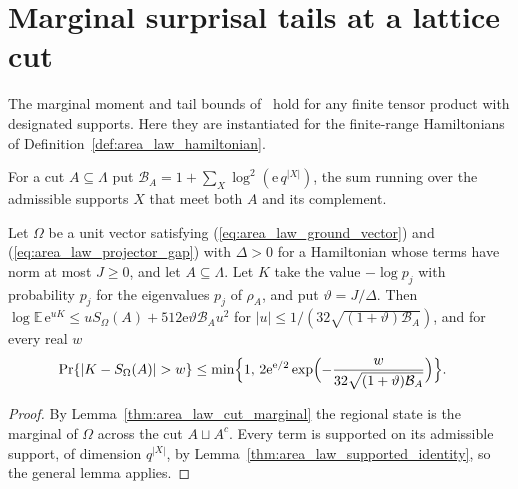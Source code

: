 \section{Marginal surprisal tails at a lattice cut}
\label{sec:area_law_marginal_tails}

The marginal moment and tail bounds of~\cite[Lemma~3.1]{OpenAI2026AreaLaw}
hold for any finite tensor product with designated supports. Here they are
instantiated for the finite-range Hamiltonians of
Definition~\ref{def:area_law_hamiltonian}.

\begin{definition}
    \label{def:area_law_cut_log_budget}
    \leanok
    For a cut $A\subseteq\Lambda$ put
    $\mathcal B_A=1+\sum_X\log^2(\mathrm e\,q^{|X|})$, the sum running over
    the admissible supports $X$ that meet both $A$ and its complement.
\end{definition}

\begin{lemma}
    \label{thm:area_law_marginal_tails}
    \leanok
    Let $\Omega$ be a unit vector satisfying (\ref{eq:area_law_ground_vector})
    and (\ref{eq:area_law_projector_gap}) with $\Delta>0$ for a Hamiltonian whose terms have norm
    at most $J\ge0$, and let $A\subseteq\Lambda$. Let $K$ take the value
    $-\log p_j$ with probability $p_j$ for the eigenvalues $p_j$ of
    $\rho_A$, and put $\vartheta=J/\Delta$. Then
    $\log\mathbb E\,\mathrm e^{uK}\le uS_\Omega(A)+512\mathrm e\vartheta
        \mathcal B_Au^2$ for $|u|\le1/(32\sqrt{(1+\vartheta)\mathcal B_A})$, and
    for every real $w$
    \begin{align}
        \Pr\{|K-S_\Omega(A)|>w\} & \le\min\Bigl\{1,\,2\mathrm e^{\mathrm e/2}
        \exp\Bigl(-\frac{w}{32\sqrt{(1+\vartheta)\mathcal B_A}}\Bigr)\Bigr\}.
        \label{eq:area_law_marginal_tail}
    \end{align}
\end{lemma}
\begin{proof}\leanok
    By Lemma~\ref{thm:area_law_cut_marginal} the regional state is the
    marginal of $\Omega$ across the cut $A\sqcup A^c$. Every term is supported
    on its admissible support, of dimension $q^{|X|}$, by
    Lemma~\ref{thm:area_law_supported_identity}, so the general lemma
    applies.
\end{proof}

